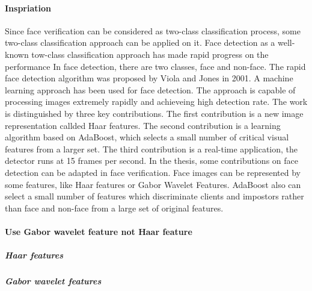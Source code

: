 \paragraph{Inspriation}
Since face verification can be considered as two-class classification process, some two-class classification approach can be applied on it. Face detection as  a well-known tow-class classification approach has made rapid progress on the performance  In face detection, there are two classes, face and non-face. The rapid face detection algorithm was proposed by Viola and Jones \cite{Viola2001} in 2001. A machine learning approach has been used for face detection. The approach is capable of processing images extremely rapidly and achieveing high detection rate. The work is distinguished by three key contributions. The first contribution is a new image representation callded Haar features. The second contribution is a learning algorithm based on AdaBoost, which selects a small number of critical visual features from a larger set. The third contribution is a real-time application, the detector runs at 15 frames per second. In the thesis, some contributions on face detection can be adapted in face verification. Face images can be represented by some features, like Haar features or Gabor Wavelet Features. AdaBoost also can select a small number of features which discriminate clients and impostors rather than face and non-face from a large set of original features. 
\paragraph{Use Gabor wavelet feature not Haar feature}
\subparagraph[short]{Haar features}
\subparagraph[short]{Gabor wavelet features}
